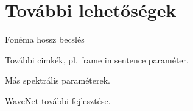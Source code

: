 \section{További lehetőségek}
\label{future_plans}
Fonéma hossz becslés

További cimkék, pl. frame in sentence paraméter.

Más spektrális paraméterek.

WaveNet további fejlesztése.